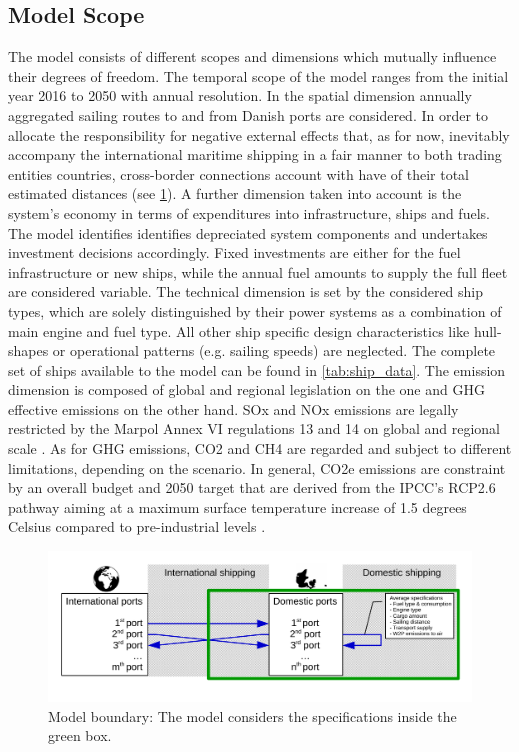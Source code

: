 \documentclass[article]{elsarticle}
\begin{document}
\subsection{Model Scope}
The model consists of different scopes and dimensions which mutually influence their degrees of freedom. The temporal scope of the model ranges from the initial year 2016 to 2050 with annual resolution. In the spatial dimension annually aggregated sailing routes to and from Danish ports are considered. In order to allocate the responsibility for negative external effects that, as for now, inevitably accompany the international maritime shipping in a fair manner to both trading entities countries, cross-border connections account with have of their total estimated distances (see \cref{fig:model_boundary}). A further dimension taken into account is the system's economy in terms of expenditures into infrastructure, ships and fuels. The model identifies identifies depreciated system components and undertakes investment decisions accordingly. Fixed investments are either for the fuel infrastructure or new ships, while the annual fuel amounts to supply the full fleet are considered variable. The technical dimension is set by the considered ship types, which are solely distinguished by their power systems as a combination of main engine and fuel type. All other ship specific design characteristics like hull-shapes or operational patterns (e.g. sailing speeds) are neglected. The complete set of ships available to the model can be found in \cref{tab:ship_data}. The emission dimension is composed of global and regional legislation on the one and GHG effective emissions on the other hand. SOx and NOx emissions are legally restricted by the Marpol Annex VI regulations 13 and 14 on global and regional scale \cite{IMO2008a,IMO2008b}. As for GHG emissions, CO2 and CH4 are regarded and subject to different limitations, depending on the scenario. In general, CO2e emissions are constraint by an overall budget and 2050 target that are derived from the IPCC's RCP2.6 pathway aiming at a maximum surface temperature increase of 1.5 degrees Celsius compared to pre-industrial levels \cite[p.~27]{IPCC2013}.

\begin{figure}[htb]
    \centering
    \includegraphics[width=\textwidth]{figures/model_boundary_paper.pdf}
    \caption{Model boundary: The model considers the specifications inside the green box.}
    \label{fig:model_boundary}
\end{figure}
\end{document}
